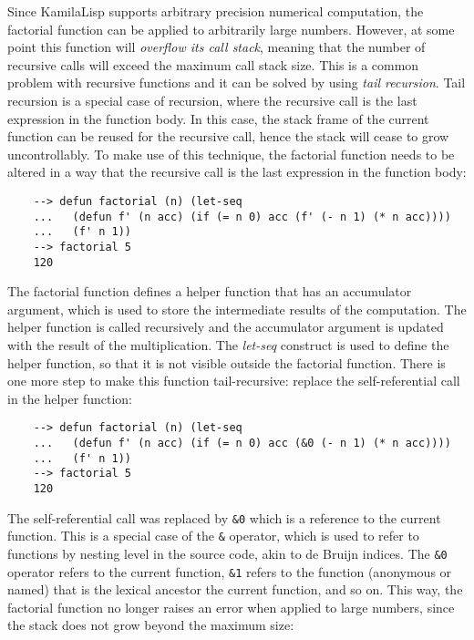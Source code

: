 Since KamilaLisp supports arbitrary precision numerical computation, the factorial function can be applied to arbitrarily large numbers. However, at some point this function will \textit{overflow its call stack}, meaning that the number of recursive calls will exceed the maximum call stack size. This is a common problem with recursive functions and it can be solved by using \textit{tail recursion}. Tail recursion is a special case of recursion, where the recursive call is the last expression in the function body. In this case, the stack frame of the current function can be reused for the recursive call, hence the stack will cease to grow uncontrollably. To make use of this technique, the factorial function needs to be altered in a way that the recursive call is the last expression in the function body:

\begin{Verbatim}
    --> defun factorial (n) (let-seq 
    ...   (defun f' (n acc) (if (= n 0) acc (f' (- n 1) (* n acc))))
    ...   (f' n 1))
    --> factorial 5
    120
\end{Verbatim}

The factorial function defines a helper function that has an accumulator argument, which is used to store the intermediate results of the computation. The helper function is called recursively and the accumulator argument is updated with the result of the multiplication. The \textit{let-seq} construct is used to define the helper function, so that it is not visible outside the factorial function. There is one more step to make this function tail-recursive: replace the self-referential call in the helper function:

\begin{Verbatim}
    --> defun factorial (n) (let-seq
    ...   (defun f' (n acc) (if (= n 0) acc (&0 (- n 1) (* n acc))))
    ...   (f' n 1))
    --> factorial 5
    120
\end{Verbatim}

The self-referential call was replaced by \verb|&0| which is a reference to the current function. This is a special case of the \verb|&| operator, which is used to refer to functions by nesting level in the source code, akin to de Bruijn indices. The \verb|&0| operator refers to the current function, \verb|&1| refers to the function (anonymous or named) that is the lexical ancestor the current function, and so on. This way, the factorial function no longer raises an error when applied to large numbers, since the stack does not grow beyond the maximum size:

